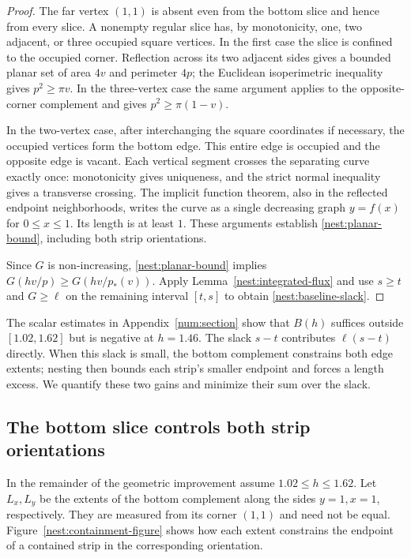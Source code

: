 \begin{proof}
The far vertex $(1,1)$ is absent even from the bottom slice and hence
from every slice.  A nonempty regular slice has, by monotonicity,
one, two adjacent, or three occupied square vertices.  In the first
case the slice is confined to the occupied corner.  Reflection across
its two adjacent sides gives a bounded planar set of area $4v$ and
perimeter $4p$; the Euclidean isoperimetric inequality gives
$p^2\geq\pi v$.  In the three-vertex case the same argument applies
to the opposite-corner complement and gives $p^2\geq\pi(1-v)$.

In the two-vertex case, after interchanging the square coordinates if
necessary, the occupied vertices form the bottom edge.  This entire
edge is occupied and the opposite edge is vacant.  Each vertical
segment crosses the separating curve exactly once: monotonicity
gives uniqueness, and the strict normal inequality gives a transverse
crossing.  The implicit function theorem, also in the reflected
endpoint neighborhoods, writes the curve as a single decreasing
graph $y=f(x)$ for $0\leq x\leq1$.  Its length is at least $1$.
These arguments establish \eqref{nest:planar-bound}, including both
strip orientations.

Since $G$ is non-increasing, \eqref{nest:planar-bound} implies
$G(hv/p)\geq G(hv/p_*(v))$.  Apply
Lemma~\ref{nest:integrated-flux} and use $s\geq t$ and $G\geq\ell$
on the remaining interval $[t,s]$ to obtain
\eqref{nest:baseline-slack}.
\end{proof}

The scalar estimates in Appendix~\ref{num:section} show that $B(h)$
suffices outside $[1.02,1.62]$ but is negative at $h=1.46$.
The slack $s-t$ contributes $\ell(s-t)$ directly. When this slack is
small, the bottom complement constrains both edge extents; nesting
then bounds each strip's smaller endpoint and forces a length excess.
We quantify these two gains and minimize their sum over the slack.

\subsection{The bottom slice controls both strip orientations}

In the remainder of the geometric improvement assume
$1.02\leq h\leq1.62$.  Let $L_x,L_y$ be the extents of the bottom
complement along the sides $y=1,x=1$, respectively.  They are measured
from its corner $(1,1)$ and need not be equal.
Figure~\ref{nest:containment-figure} shows how each extent constrains
the endpoint of a contained strip in the corresponding orientation.

